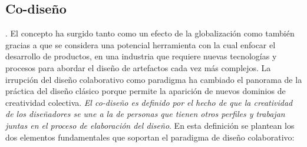 \subsection{Co-diseño}
 \citep{Huerta2013}. El concepto ha surgido tanto como un efecto de la globalización como también gracias a que se considera una potencial herramienta con la cual enfocar el desarrollo de productos, en una industria que requiere nuevas tecnologías y procesos para abordar el diseño de artefactos cada vez más complejos. La irrupción del diseño colaborativo como paradigma ha cambiado el panorama de la práctica del diseño clásico porque permite la aparición de nuevos dominios de creatividad colectiva. 
\textit{El co-diseño es definido por el hecho de que la creatividad de los diseñadores se une a la de personas que tienen otros perfiles y trabajan juntas en el proceso de elaboración del diseño}.
En esta definición se plantean los dos elementos fundamentales que soportan el paradigma de diseño colaborativo:
